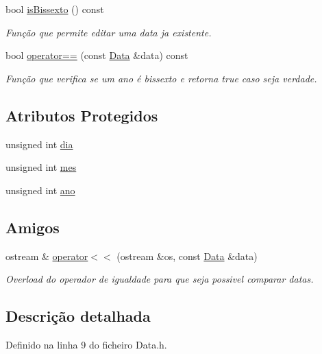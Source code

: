 \begin{DoxyCompactItemize}
bool \hyperlink{class_data_a5b6b3123dc96de5969fc435f26322bc2}{is\+Bissexto} () const 
\begin{DoxyCompactList}\small\item\em Função que permite editar uma data ja existente. \end{DoxyCompactList}\item 
bool \hyperlink{class_data_a682016837c60b8e801d4bcee3e694039}{operator==} (const \hyperlink{class_data}{Data} \&data) const 
\begin{DoxyCompactList}\small\item\em Função que verifica se um ano é bissexto e retorna true caso seja verdade. \end{DoxyCompactList}\end{DoxyCompactItemize}
\subsection*{Atributos Protegidos}
\begin{DoxyCompactItemize}
\item 
unsigned int \hyperlink{class_data_a71a904380d17858da0b902e9a2563546}{dia}
\item 
unsigned int \hyperlink{class_data_a586deb479ec2031a0d3ceec8280f7706}{mes}
\item 
unsigned int \hyperlink{class_data_a1811fab972bdf6ed644c4eb7412bd043}{ano}
\end{DoxyCompactItemize}
\subsection*{Amigos}
\begin{DoxyCompactItemize}
\item 
ostream \& \hyperlink{class_data_acab3a0f9e78c85c62b0ea9348aa877d8}{operator$<$$<$} (ostream \&os, const \hyperlink{class_data}{Data} \&data)
\begin{DoxyCompactList}\small\item\em Overload do operador de igualdade para que seja possivel comparar datas. \end{DoxyCompactList}\end{DoxyCompactItemize}


\subsection{Descrição detalhada}


Definido na linha 9 do ficheiro Data.\+h.



